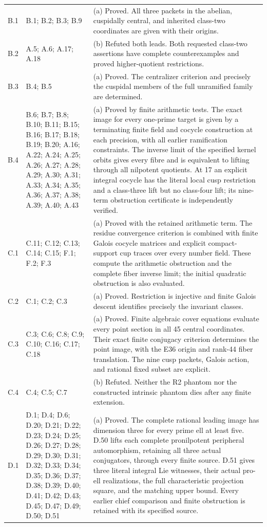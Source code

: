 \begin{longtable}{@{}p{1.1cm}p{3.0cm}p{10.3cm}@{}}
B.1 & B.1; B.2; B.3; B.9 & (a) Proved. All three packets in the abelian, cuspidally central, and inherited class-two coordinates are given with their origins. \\
B.2 & A.5; A.6; A.17; A.18 & (b) Refuted both leads. Both requested class-two assertions have complete counterexamples and proved higher-quotient restrictions. \\
B.3 & B.4; B.5 & (a) Proved. The centralizer criterion and precisely the cuspidal members of the full unramified family are determined. \\
B.4 & B.6; B.7; B.8; B.10; B.11; B.15; B.16; B.17; B.18; B.19; B.20; A.16; A.22; A.24; A.25; A.26; A.27; A.28; A.29; A.30; A.31; A.33; A.34; A.35; A.36; A.37; A.38; A.39; A.40; A.43 & (a) Proved by finite arithmetic tests. The exact image for every one-prime target is given by a terminating finite field and cocycle construction at each precision, with all earlier ramification constraints. The inverse limit of the specified kernel orbits gives every fibre and is equivalent to lifting through all nilpotent quotients. At 17 an explicit integral cocycle has the literal local cusp restriction and a class-three lift but no class-four lift; its nine-term obstruction certificate is independently verified. \\
C.1 & C.11; C.12; C.13; C.14; C.15; F.1; F.2; F.3 & (a) Proved with the retained arithmetic term. The residue convergence criterion is combined with finite Galois cocycle matrices and explicit compact-support cup traces over every number field. These compute the arithmetic obstruction and the complete fiber inverse limit; the initial quadratic obstruction is also evaluated. \\
C.2 & C.1; C.2; C.3 & (a) Proved. Restriction is injective and finite Galois descent identifies precisely the invariant classes. \\
C.3 & C.3; C.6; C.8; C.9; C.10; C.16; C.17; C.18 & (a) Proved. Finite algebraic cover equations evaluate every point section in all 45 central coordinates. Their exact finite conjugacy criterion determines the point image, with the E36 origin and rank-44 fiber translation. The nine cusp packets, Galois action, and rational fixed subset are explicit. \\
C.4 & C.4; C.5; C.7 & (b) Refuted. Neither the R2 phantom nor the constructed intrinsic phantom dies after any finite extension. \\
D.1 & D.1; D.4; D.6; D.20; D.21; D.22; D.23; D.24; D.25; D.26; D.27; D.28; D.29; D.30; D.31; D.32; D.33; D.34; D.35; D.36; D.37; D.38; D.39; D.40; D.41; D.42; D.43; D.45; D.47; D.49; D.50; D.51 & (a) Proved. The complete rational leading image has dimension three for every prime ell at least five. D.50 lifts each complete pronilpotent peripheral automorphism, retaining all three actual conjugators, through every finite source. D.51 gives three literal integral Lie witnesses, their actual pro-ell realizations, the full characteristic projection square, and the matching upper bound. Every earlier chief comparison and finite obstruction is retained with its specified source. \\

\end{longtable}
